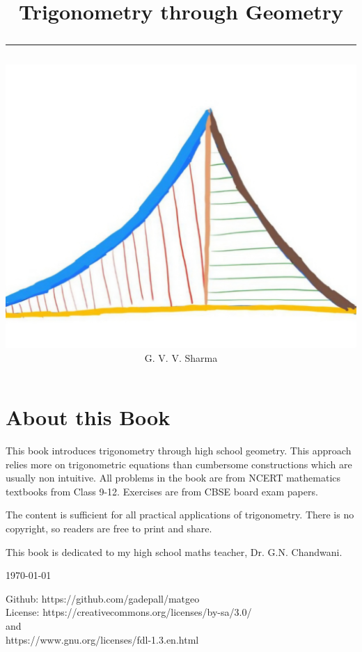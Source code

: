 \documentclass[journal]{IEEEtran}
\begin{document}

\onecolumn


\title{
	\begin{center}
	Trigonometry through Geometry
	\\
\rule{0.4\columnwidth}{0.4pt}
\end{center}
}
\author{
\vspace{11cm}
	\begin{center}
\includegraphics[width=0.2\columnwidth]{figs/logo.jpg}
\\
		{	\huge G. V. V. Sharma}
	\end{center}
}
\maketitle

\newpage
\section*{About this Book}

This book introduces trigonometry through high school geometry. This approach relies more on trigonometric equations than cumbersome constructions which are usually non intuitive.
 All problems in the book are from NCERT mathematics textbooks from Class 9-12.  Exercises are from CBSE board exam papers.   

The content is sufficient for all practical applications of trigonometry.
There is no copyright, so readers are free to print and share.  

This book is dedicated to my high school maths teacher, Dr. G.N. Chandwani. 
\begin{flushright}
\today
\end{flushright}
Github: https://github.com/gadepall/matgeo
		\\
License: https://creativecommons.org/licenses/by-sa/3.0/
\\
and
\\
https://www.gnu.org/licenses/fdl-1.3.en.html
\end{document}
